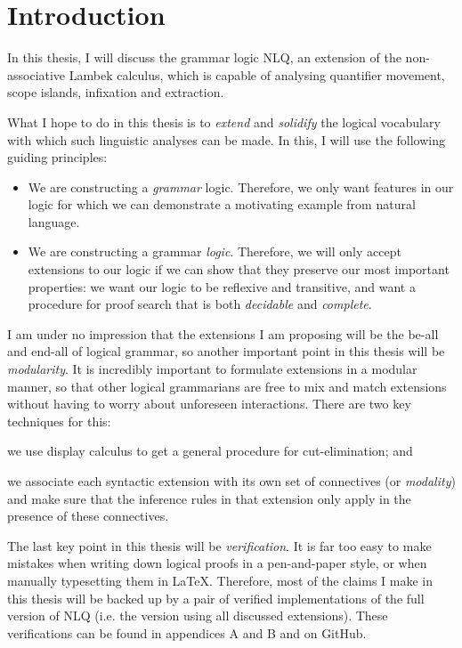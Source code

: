 \section{Introduction}
\label{sec:introduction}

In this thesis, I will discuss the grammar logic NLQ, an extension of
the non-associative Lambek calculus, which is capable of analysing
quantifier movement, scope islands, infixation and extraction.

What I hope to do in this thesis is to \emph{extend} and
\emph{solidify} the logical vocabulary with which such linguistic
analyses can be made. In this, I will use the following guiding
principles:
\begin{itemize}
\item We are constructing a \emph{grammar} logic. Therefore, we only
  want features in our logic for which we can demonstrate a motivating
  example from natural language.
\item We are constructing a grammar \emph{logic}. Therefore, we will
  only accept extensions to our logic if we can show that they
  preserve our most important properties: we want our logic to be
  reflexive and transitive, and want a procedure for proof
  search that is both \emph{decidable} and \emph{complete}.
\end{itemize}
I am under no impression that the extensions I am proposing will be
the be-all and end-all of logical grammar, so another important point
in this thesis will be \emph{modularity}.
It is incredibly important to formulate extensions in a modular
manner, so that other logical grammarians are free to mix and
match extensions without having to worry about unforeseen
interactions. There are two key techniques for this:
\begin{enumerate*}[label=(\arabic*)]
\item
  we use display calculus to get a general procedure for
  cut-elimination; and
\item
  we associate each syntactic extension with its own set of
  connectives (or \emph{modality}) and make sure that the inference
  rules in that extension only apply in the presence of these
  connectives.
\end{enumerate*}


The last key point in this thesis will be \emph{verification}. It is
far too easy to make mistakes when writing down logical proofs in a
pen-and-paper style, or when manually typesetting them in
\LaTeX. Therefore, most of the claims I make in this thesis will be
backed up by a pair of verified implementations of the full version
of NLQ (i.e. the version using all discussed extensions).
These verifications can be found in appendices A and B and on GitHub.


